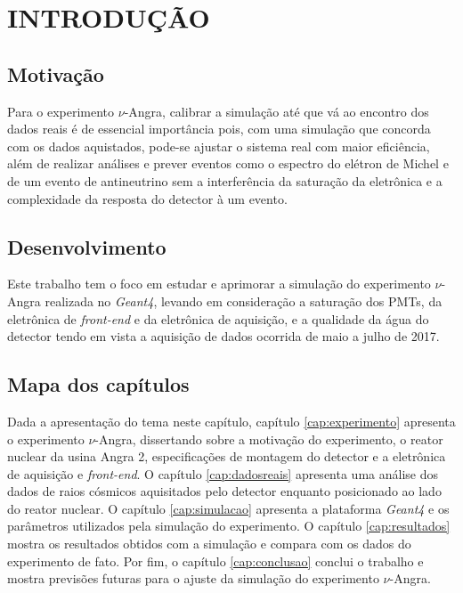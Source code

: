 \chapter{INTRODUÇÃO} \label{cap:intro}
\vspace{-2cm}



\section{Motivação} 

Para o experimento $\nu$-Angra, calibrar a simulação até que vá ao encontro dos dados reais é de essencial importância pois, com uma simulação que concorda com os dados aquistados, pode-se ajustar o sistema real com maior eficiência, além de realizar análises e prever eventos como o espectro do elétron de Michel e de um evento de antineutrino sem a interferência da saturação da eletrônica e a complexidade da resposta do detector à um evento. 

\section{Desenvolvimento}

Este trabalho tem o foco em estudar e aprimorar a simulação do experimento $\nu$-Angra realizada no \emph{Geant4}, levando em consideração a saturação dos \ac{PMTs}, da eletrônica de \emph{front-end} e da eletrônica de aquisição, e a qualidade da água do detector tendo em vista a aquisição de dados ocorrida de maio a julho de 2017.

\section{Mapa dos capítulos}

Dada a apresentação do tema neste capítulo, capítulo \ref{cap:experimento} apresenta o experimento $\nu$-Angra, dissertando sobre a motivação do experimento, o reator nuclear da usina Angra 2, especificações de montagem do detector e a eletrônica de aquisição e \emph{front-end}. O capítulo \ref{cap:dadosreais} apresenta uma análise dos dados de raios cósmicos aquisitados pelo detector enquanto posicionado ao lado do reator nuclear. O capítulo \ref{cap:simulacao} apresenta a plataforma \emph{Geant4} e os parâmetros utilizados pela simulação do experimento. O capítulo \ref{cap:resultados} mostra os resultados obtidos com a simulação e compara com os dados do experimento de fato. Por fim, o capítulo \ref{cap:conclusao} conclui o trabalho e mostra previsões futuras para o ajuste da simulação do experimento $\nu$-Angra.